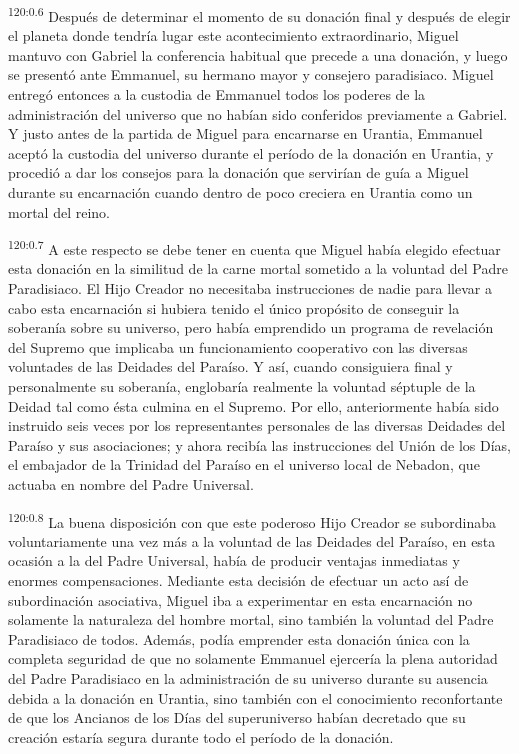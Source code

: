 \par
\textsuperscript{120:0.6} Después de determinar el momento de su donación final y después de elegir el planeta donde tendría lugar este acontecimiento extraordinario, Miguel mantuvo con Gabriel la conferencia habitual que precede a una donación, y luego se presentó ante Emmanuel, su hermano mayor y consejero paradisiaco. Miguel entregó entonces a la custodia de Emmanuel todos los poderes de la administración del universo que no habían sido conferidos previamente a Gabriel. Y justo antes de la partida de Miguel para encarnarse en Urantia, Emmanuel aceptó la custodia del universo durante el período de la donación en Urantia, y procedió a dar los consejos para la donación que servirían de guía a Miguel durante su encarnación cuando dentro de poco creciera en Urantia como un mortal del reino.

\par
\textsuperscript{120:0.7} A este respecto se debe tener en cuenta que Miguel había elegido efectuar esta donación en la similitud de la carne mortal sometido a la voluntad del Padre Paradisiaco. El Hijo Creador no necesitaba instrucciones de nadie para llevar a cabo esta encarnación si hubiera tenido el único propósito de conseguir la soberanía sobre su universo, pero había emprendido un programa de revelación del Supremo que implicaba un funcionamiento cooperativo con las diversas voluntades de las Deidades del Paraíso. Y así, cuando consiguiera final y personalmente su soberanía, englobaría realmente la voluntad séptuple de la Deidad tal como ésta culmina en el Supremo. Por ello, anteriormente había sido instruido seis veces por los representantes personales de las diversas Deidades del Paraíso y sus asociaciones; y ahora recibía las instrucciones del Unión de los Días, el embajador de la Trinidad del Paraíso en el universo local de Nebadon, que actuaba en nombre del Padre Universal.

\par
\textsuperscript{120:0.8} La buena disposición con que este poderoso Hijo Creador se subordinaba voluntariamente una vez más a la voluntad de las Deidades del Paraíso, en esta ocasión a la del Padre Universal, había de producir ventajas inmediatas y enormes compensaciones. Mediante esta decisión de efectuar un acto así de subordinación asociativa, Miguel iba a experimentar en esta encarnación no solamente la naturaleza del hombre mortal, sino también la voluntad del Padre Paradisiaco de todos. Además, podía emprender esta donación única con la completa seguridad de que no solamente Emmanuel ejercería la plena autoridad del Padre Paradisiaco en la administración de su universo durante su ausencia debida a la donación en Urantia, sino también con el conocimiento reconfortante de que los Ancianos de los Días del superuniverso habían decretado que su creación estaría segura durante todo el período de la donación.


